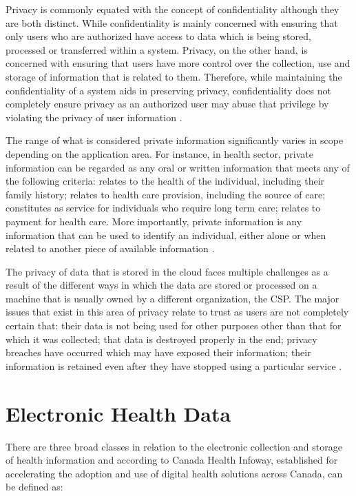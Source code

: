 Privacy is commonly equated with the concept of confidentiality although they are both distinct. While confidentiality is mainly concerned with ensuring that only users who are authorized have access to data which is being stored, processed or transferred within a system. Privacy, on the other hand, is concerned with ensuring that users have more control over the collection, use and storage of information that is related to them. Therefore, while maintaining the confidentiality of a system aids in preserving privacy, confidentiality does not completely ensure privacy as an authorized user may abuse that privilege by violating the privacy of user information \cite{pearsonprivacy}.

The range of what is considered private information significantly varies in scope depending on the application area. For instance, in health sector, private information can be regarded as any oral or written information that meets any of the following criteria: relates to the health of the individual, including their family history; relates to health care provision, including the source of care; constitutes as service for individuals who require long term care; relates to payment for health care. More importantly, private information is any information that can be used to identify an individual, either alone or when related to another piece of available information \cite{annpia}.

The privacy of data that is stored in the cloud faces multiple challenges as a result of the different ways in which the data are stored or processed on a machine that is usually owned by a different organization, the CSP. The major issues that exist in this area of privacy relate to trust as users are not completely certain that: their data is not being used for other purposes other than that for which it was collected; that data is destroyed properly in the end; privacy breaches have occurred which may have exposed their information; their information is retained even after they have stopped using a particular service \cite{pearsonprivacy}.

\section{Electronic Health Data}

There are three broad classes in relation to the electronic collection and storage of health information and according to Canada Health Infoway, established for accelerating the adoption and use of digital health solutions across Canada, can be defined as:

